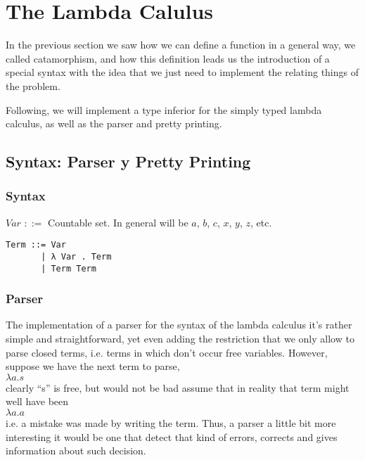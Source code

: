 \documentclass[a4paper,10pt]{article}
\begin{document}
\section{The Lambda Calulus}

In the previous section we saw how we can define a function in a general way, we called
catamorphism, and how this definition leads us the introduction of a special syntax
with the idea that we just need to implement the relating things of the problem.

Following, we will implement a type inferior for the simply typed lambda calculus, as
well as the parser and pretty printing.

\subsection{Syntax: Parser y Pretty Printing}

\subsubsection{Syntax}

$Var$ $::=$ Countable set. In general will be $a$, $b$, $c$, $x$, $y$, $z$, etc.

\begin{lstlisting}
Term ::= Var
       | λ Var . Term
       | Term Term
\end{lstlisting}

\subsubsection{Parser}

The implementation of a parser for the syntax of the lambda calculus it's rather simple
and straightforward, yet even adding the restriction that we only allow to parse closed
terms, i.e. terms in which don't occur free variables.
However, suppose we have the next term to parse,\\

$\lambda a . s$\\

clearly ``s'' is free, but would not be bad assume that in reality that term might well
have been\\

$\lambda a . a$\\

i.e. a mistake was made by writing the term. Thus, a parser a little bit
more interesting it would be one that detect that kind of errors, corrects
and gives information about such decision.\\
\end{document}
